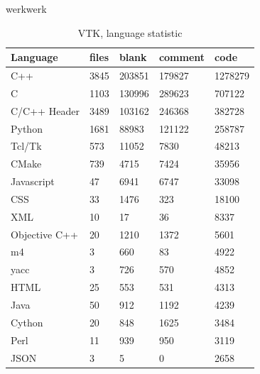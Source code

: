 werkwerk
\begin{table}[h]
	\centering
	\caption{VTK, language statistic}
    \sffamily 
	\begin{tabular}{ l|l|l|l|l }
		\hline
		\textbf{Language}&      \textbf{files}&\textbf{blank}& \textbf{comment}& \textbf{code}\\
		\hline
		C++                                   &3845         &203851         &179827        &1278279\\
		C                                     &1103         &130996         &289623        &707122\\
		C/C++ Header                          &3489         &103162         &246368        & 382728\\
		Python                                &1681         & 88983         &121122        & 258787\\
		Tcl/Tk                                & 573         & 11052         &  7830        &  48213\\
		CMake                                 & 739         &  4715         &  7424        &  35956\\
		Javascript                            &  47         &  6941         &  6747        &  33098\\
		CSS                                   &  33         &  1476         &   323        &  18100\\
		XML                                   &  10         &    17         &    36        &   8337\\
		Objective C++                         &  20         &  1210         &  1372        &   5601\\
		m4                                    &   3         &   660         &    83        &   4922\\
		yacc                                  &   3         &   726         &   570        &   4852\\
		HTML                                  &  25         &   553         &   531        &   4313\\
		Java                                  &  50         &   912         &  1192        &   4239\\
		Cython                                &  20         &   848         &  1625        &   3484\\
		Perl                                  &  11         &   939         &   950        &   3119\\
		JSON                                  &   3         &     5         &     0        &   2658\\

\end{tabular}
\end{table}
